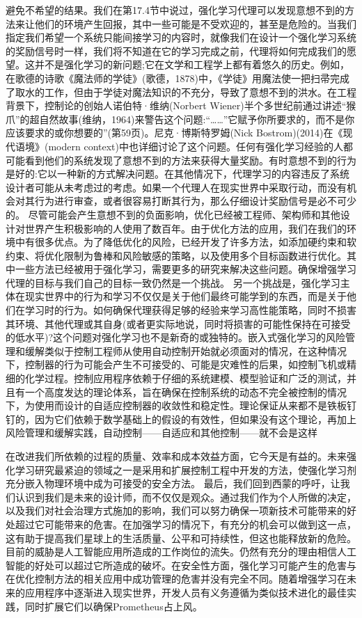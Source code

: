 避免不希望的结果。我们在第17.4节中说过，强化学习代理可以发现意想不到的方法来让他们的环境产生回报，其中一些可能是不受欢迎的，甚至是危险的。当我们指定我们希望一个系统只能间接学习的内容时，就像我们在设计一个强化学习系统的奖励信号时一样，我们将不知道在它的学习完成之前，代理将如何完成我们的愿望。这并不是强化学习的新问题;它在文学和工程学上都有着悠久的历史。例如，在歌德的诗歌《魔法师的学徒》(歌德，1878)中，《学徒》用魔法使一把扫帚完成了取水的工作，但由于学徒对魔法知识的不充分，导致了意想不到的洪水。在工程背景下，控制论的创始人诺伯特·维纳(Norbert Wiener)半个多世纪前通过讲述“猴爪”的超自然故事(维纳，1964)来警告这个问题:“……”它赋予你所要求的，而不是你应该要求的或你想要的”(第59页)。尼克·博斯特罗姆(Nick Bostrom)(2014)在《现代语境》(modern context)中也详细讨论了这个问题。任何有强化学习经验的人都可能看到他们的系统发现了意想不到的方法来获得大量奖励。有时意想不到的行为是好的:它以一种新的方式解决问题。在其他情况下，代理学习的内容违反了系统设计者可能从未考虑过的考虑。如果一个代理人在现实世界中采取行动，而没有机会对其行为进行审查，或者很容易打断其行为，那么仔细设计奖励信号是必不可少的。
尽管可能会产生意想不到的负面影响，优化已经被工程师、架构师和其他设计对世界产生积极影响的人使用了数百年。由于优化方法的应用，我们在我们的环境中有很多优点。为了降低优化的风险，已经开发了许多方法，如添加硬约束和软约束、将优化限制为鲁棒和风险敏感的策略，以及使用多个目标函数进行优化。其中一些方法已经被用于强化学习，需要更多的研究来解决这些问题。确保增强学习代理的目标与我们自己的目标一致仍然是一个挑战。
另一个挑战是，强化学习主体在现实世界中的行为和学习不仅仅是关于他们最终可能学到的东西，而是关于他们在学习时的行为。如何确保代理获得足够的经验来学习高性能策略，同时不损害其环境、其他代理或其自身(或者更实际地说，同时将损害的可能性保持在可接受的低水平)?这个问题对强化学习也不是新奇的或独特的。嵌入式强化学习的风险管理和缓解类似于控制工程师从使用自动控制开始就必须面对的情况，在这种情况下，控制器的行为可能会产生不可接受的、可能是灾难性的后果，如控制飞机或精细的化学过程。控制应用程序依赖于仔细的系统建模、模型验证和广泛的测试，并且有一个高度发达的理论体系，旨在确保在控制系统的动态不完全被控制的情况下，为使用而设计的自适应控制器的收敛性和稳定性。理论保证从来都不是铁板钉钉的，因为它们依赖于数学基础上的假设的有效性，但如果没有这个理论，再加上风险管理和缓解实践，自动控制——自适应和其他控制——就不会是这样

在改进我们所依赖的过程的质量、效率和成本效益方面，它今天是有益的。未来强化学习研究最紧迫的领域之一是采用和扩展控制工程中开发的方法，使强化学习剂充分嵌入物理环境中成为可接受的安全方法。
最后，我们回到西蒙的呼吁，让我们认识到我们是未来的设计师，而不仅仅是观众。通过我们作为个人所做的决定，以及我们对社会治理方式施加的影响，我们可以努力确保一项新技术可能带来的好处超过它可能带来的危害。在加强学习的情况下，有充分的机会可以做到这一点，这有助于提高我们星球上的生活质量、公平和可持续性，但这也能释放新的危险。目前的威胁是人工智能应用所造成的工作岗位的流失。仍然有充分的理由相信人工智能的好处可以超过它所造成的破坏。在安全性方面，强化学习可能产生的危害与在优化控制方法的相关应用中成功管理的危害并没有完全不同。随着增强学习在未来的应用程序中逐渐进入现实世界，开发人员有义务遵循为类似技术进化的最佳实践，同时扩展它们以确保Prometheus占上风。

